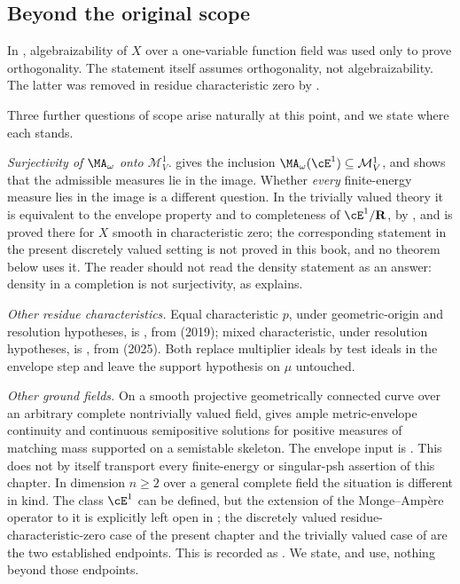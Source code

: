 \subsection{Beyond the original scope}
\label{sec:ch28-surjectivity}

In \cite{BFJ15}, algebraizability of \(X\) over a one-variable function
field was used only to prove orthogonality.  The statement
 itself assumes orthogonality, not
algebraizability.  The latter was removed in residue characteristic zero by
\cite[Theorem~6.3.3 and Corollary~6.3.4]{BGGJKM20}.

Three further questions of scope arise naturally at this point, and we state
where each stands.

\emph{Surjectivity of \(\MA_\omega\) onto \(\mathcal M^1_V\).}
 gives the inclusion
\(\MA_\omega(\cE^1)\subseteq\mathcal M^1_V\), and
 shows that the admissible measures lie
in the image.  Whether \emph{every} finite-energy measure lies in the image
is a different question.  In the trivially valued theory it is equivalent to
the envelope property and to completeness of \(\cE^1/\mathbf R\), by
\cite[Theorem~12.8]{BJ22}, and is proved there for \(X\) smooth in
characteristic zero; the corresponding statement in the present discretely
valued setting is not proved in this book, and no theorem below uses it.
The reader should not read the density statement
 as an answer: density in a
completion is not surjectivity, as
 explains.

\emph{Other residue characteristics.}  Equal characteristic \(p\), under
geometric-origin and resolution hypotheses, is
, from \cite{GJKM19} (2019);
mixed characteristic, under resolution hypotheses, is
, from \cite{FGK25} (2025).  Both
replace multiplier ideals by test ideals in the envelope step and leave the
support hypothesis on \(\mu\) untouched.

\emph{Other ground fields.}  On a smooth projective geometrically
connected curve over an arbitrary complete nontrivially valued field,
 gives ample metric-envelope
continuity and continuous semipositive solutions for positive measures of
matching mass supported on a semistable skeleton.  The envelope input is
\cite[Theorem~1.1]{GJKM19}.  This does not by itself transport every
finite-energy or singular-psh assertion of this chapter.
In dimension \(n\geq2\) over a
general complete field the situation is different in kind.  The class
\(\cE^1\) can be defined, but the extension of the Monge--Amp\`ere operator
to it is explicitly left open in \cite[Remark~4.4]{PS23Hybrid}; the
discretely valued residue-characteristic-zero case of the present chapter and
the trivially valued case of  are the two
established endpoints.  This is recorded as
.  We state, and use, nothing beyond those
endpoints.

